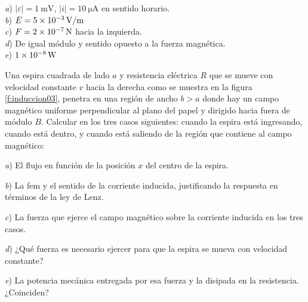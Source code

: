 \begin{Answer}
    \begin{minipage}[t]{.4\textwidth}
        \textit{a}) $|\varepsilon| = \SI{1}{\milli\volt}$, $|i| = \SI{10}{\micro\ampere}$ en sentido horario.\\ \textit{b}) $E = \SI{5E-3}{\volt/\metre}$\\ \textit{c}) $F = \SI{2E-7}{\newton}$ hacia la izquierda.\\ \textit{d}) De igual módulo y sentido opuesto a la fuerza magnética.\\ \textit{e}) $\SI{1E-8}{\watt}$
    \end{minipage}
\end{Answer}
%
\begin{center}
\end{center}
%
\begin{Exercise}\label{p:induccion03}
    Una espira cuadrada de lado $a$ y resistencia eléctrica $R$ que se mueve con velocidad constante $v$ hacia la derecha como se muestra en la figura \ref{f:induccion03}, penetra en una región de ancho $b > a$ donde hay un campo magnético uniforme perpendicular al plano del papel y dirigido hacia fuera de módulo $B$. Calcular en los tres casos siguientes: cuando la espira está ingresando, cuando está dentro, y cuando está saliendo de la región que contiene al campo magnético:\par
    \textit{a}) El flujo en función de la posición $x$ del centro de la espira.\par
    \textit{b}) La fem y el sentido de la corriente inducida, justificando la respuesta en términos de la ley de Lenz.\par
    \textit{c}) La fuerza que ejerce el campo magnético sobre la corriente inducida en los tres casos.\par
    \textit{d}) ¿Qué fuerza es necesario ejercer para que la espira se mueva con velocidad constante?\par
    \textit{e}) La potencia mecánica entregada por esa fuerza y la disipada en la resistencia. ¿Coinciden?
\end{Exercise}
